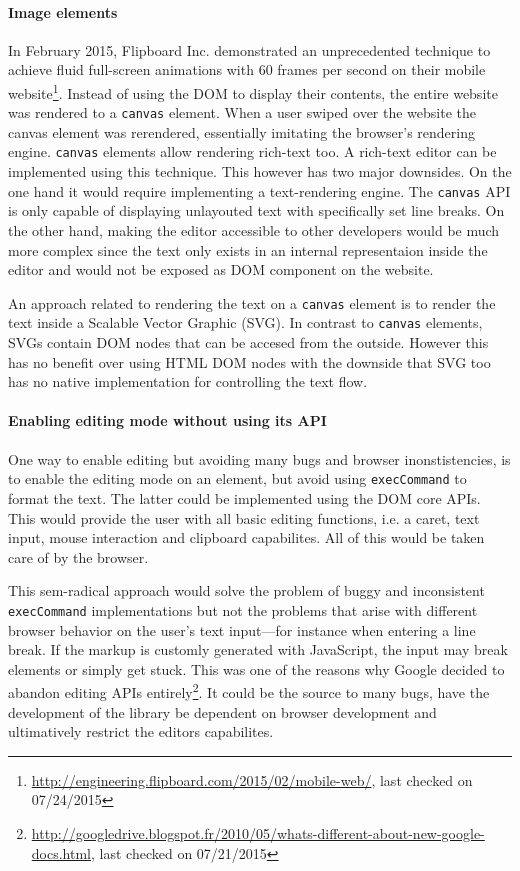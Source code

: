 \paragraph{Image elements} In February 2015, Flipboard Inc. demonstrated an unprecedented technique to achieve fluid full-screen animations with 60 frames per second on their mobile website\footnote{\url{http://engineering.flipboard.com/2015/02/mobile-web/}, last checked on 07/24/2015}. Instead of using the DOM to display their contents, the entire website was rendered to a \texttt{canvas} element. When a user swiped over the website the canvas element was rerendered, essentially imitating the browser's rendering engine. \texttt{canvas} elements allow rendering rich-text too. A rich-text editor can be implemented using this technique. This however has two major downsides. On the one hand it would require implementing a text-rendering engine. The \texttt{canvas} API is only capable of displaying unlayouted text with specifically set line breaks. On the other hand, making the editor accessible to other developers would be much more complex since the text only exists in an internal representaion inside the editor and would not be exposed as DOM component on the website.

An approach related to rendering the text on a \texttt{canvas} element is to render the text inside a Scalable Vector Graphic (SVG). In contrast to \texttt{canvas} elements, SVGs contain DOM nodes that can be accesed from the outside. However this has no benefit over using HTML DOM nodes with the downside that SVG too has no native implementation for controlling the text flow.

\paragraph{Enabling editing mode without using its API} One way to enable editing but avoiding many bugs and browser inonstistencies, is to enable the editing mode on an element, but avoid using \texttt{execCommand} to format the text. The latter could be implemented using the DOM core APIs. This would provide the user with all basic editing functions, i.e. a caret, text input, mouse interaction and clipboard capabilites. All of this would be taken care of by the browser.

This sem-radical approach would solve the problem of buggy and inconsistent \texttt{execCommand} implementations but not the problems that arise with different browser behavior on the user's text input---for instance when entering a line break. If the markup is customly generated with JavaScript, the input may break elements or simply get stuck. This was one of the reasons why Google decided to abandon editing APIs entirely\footnote{\url{http://googledrive.blogspot.fr/2010/05/whats-different-about-new-google-docs.html}, last checked on 07/21/2015}. It could be the source to many bugs, have the development of the library be dependent on browser development and ultimatively restrict the editors capabilites.

